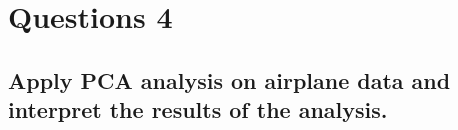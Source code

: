 \newpage
\section{Questions 4}
\label{cha:q4}

\subsection[Q4-a]{Apply PCA analysis on airplane data and interpret the results of the analysis.}







